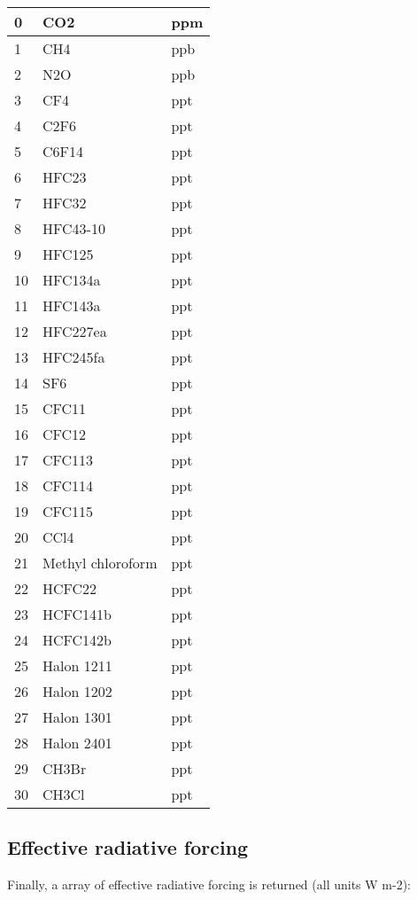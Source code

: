 \documentclass[letterpaper,10pt,english]{sphinxmanual}
\begin{document}
\begin{longtable}{|l|l|l|}
0
&
CO2
&
ppm
\\
\hline
1
&
CH4
&
ppb
\\
\hline
2
&
N2O
&
ppb
\\
\hline
3
&
CF4
&
ppt
\\
\hline
4
&
C2F6
&
ppt
\\
\hline
5
&
C6F14
&
ppt
\\
\hline
6
&
HFC23
&
ppt
\\
\hline
7
&
HFC32
&
ppt
\\
\hline
8
&
HFC43-10
&
ppt
\\
\hline
9
&
HFC125
&
ppt
\\
\hline
10
&
HFC134a
&
ppt
\\
\hline
11
&
HFC143a
&
ppt
\\
\hline
12
&
HFC227ea
&
ppt
\\
\hline
13
&
HFC245fa
&
ppt
\\
\hline
14
&
SF6
&
ppt
\\
\hline
15
&
CFC11
&
ppt
\\
\hline
16
&
CFC12
&
ppt
\\
\hline
17
&
CFC113
&
ppt
\\
\hline
18
&
CFC114
&
ppt
\\
\hline
19
&
CFC115
&
ppt
\\
\hline
20
&
CCl4
&
ppt
\\
\hline
21
&
Methyl chloroform
&
ppt
\\
\hline
22
&
HCFC22
&
ppt
\\
\hline
23
&
HCFC141b
&
ppt
\\
\hline
24
&
HCFC142b
&
ppt
\\
\hline
25
&
Halon 1211
&
ppt
\\
\hline
26
&
Halon 1202
&
ppt
\\
\hline
27
&
Halon 1301
&
ppt
\\
\hline
28
&
Halon 2401
&
ppt
\\
\hline
29
&
CH3Br
&
ppt
\\
\hline
30
&
CH3Cl
&
ppt
\\
\hline\end{longtable}



\subsection{Effective radiative forcing}
\label{\detokenize{examples:effective-radiative-forcing}}
Finally, a  array  of effective radiative forcing is
returned (all units W m-2):
\end{document}
